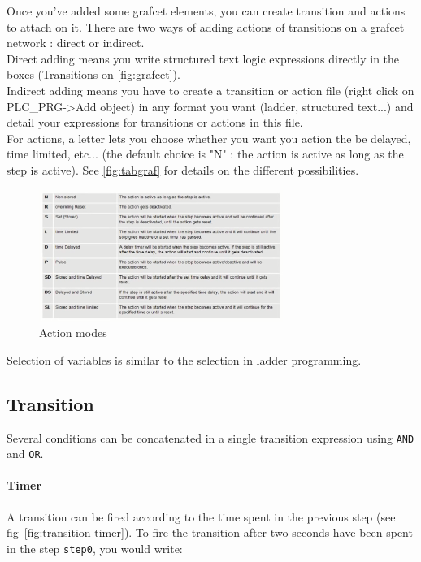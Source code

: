 \documentclass[10pt,a4paper]{article}
\begin{document}
Once you've added some grafcet elements, you can create transition and actions to attach on it.
There are two ways of adding actions of transitions on a grafcet network : direct or indirect.\\
Direct adding means you write structured text logic expressions directly in the boxes (Transitions on \vref{fig:grafcet}).\\
Indirect adding means you have to create a transition or action file (right click on PLC\_PRG->Add object) in any format you want (ladder, structured text...) and detail your expressions for transitions or actions in this file.\\
For actions, a letter lets you choose whether you want you action the be delayed, time limited, etc... (the default choice is "N" : the action is active as long as the step is active).
See \vref{fig:tabgraf} for details on the different possibilities.

\begin{figure}[h!]
	\begin{center}
		\includegraphics[width=300px]{tableaugrafcet.png}
	\end{center}
\caption{Action modes}
\label{fig:tabgraf}
\end{figure}

Selection of variables is similar to the selection in ladder programming.

\subsection{Transition}
Several conditions can be concatenated in a single transition expression using \texttt{AND} and \texttt{OR}.

\paragraph{Timer}
A transition can be fired according to the time spent in the previous step (see fig~\ref{fig:transition-timer}).
To fire the transition after two seconds have been spent in the step \texttt{step0}, you would write:
\end{document}
